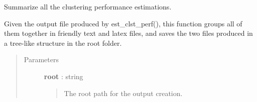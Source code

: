 \documentclass[letterpaper,10pt,english]{sphinxmanual}
\begin{document}

\begin{fulllineitems}
\label{index:adenine.core.analyze_results.make_df_clst_perf}
Summarize all the clustering performance estimations.

Given the output file produced by est\_clst\_perf(), this function groups all
of them together in friendly text and latex files, and saves the two files
produced in a tree-like structure in the root folder.
\begin{quote}\begin{description}
\item[{Parameters}] \leavevmode
\textbf{root} : string
\begin{quote}

The root path for the output creation.
\end{quote}

\end{description}\end{quote}

\end{fulllineitems}

\end{document}

